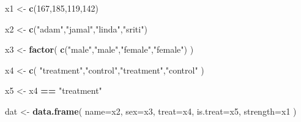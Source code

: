 \documentclass[]{book}
\newenvironment{Shaded}{\begin{snugshade}}{\end{snugshade}}
\newcommand{\DataTypeTok}[1]{\textcolor[rgb]{0.13,0.29,0.53}{#1}}
\newcommand{\DecValTok}[1]{\textcolor[rgb]{0.00,0.00,0.81}{#1}}
\newcommand{\KeywordTok}[1]{\textcolor[rgb]{0.13,0.29,0.53}{\textbf{#1}}}
\newcommand{\NormalTok}[1]{#1}
\newcommand{\OperatorTok}[1]{\textcolor[rgb]{0.81,0.36,0.00}{\textbf{#1}}}
\newcommand{\StringTok}[1]{\textcolor[rgb]{0.31,0.60,0.02}{#1}}
\theoremstyle{definition}
\theoremstyle{definition}
\theoremstyle{definition}
\theoremstyle{remark}
\begin{document}
\begin{Shaded}
\begin{Highlighting}[]
\NormalTok{x1 <-}\StringTok{ }\KeywordTok{c}\NormalTok{(}\DecValTok{167}\NormalTok{,}\DecValTok{185}\NormalTok{,}\DecValTok{119}\NormalTok{,}\DecValTok{142}\NormalTok{)}

\NormalTok{x2 <-}\StringTok{ }\KeywordTok{c}\NormalTok{(}\StringTok{"adam"}\NormalTok{,}\StringTok{"jamal"}\NormalTok{,}\StringTok{"linda"}\NormalTok{,}\StringTok{"sriti"}\NormalTok{)}

\NormalTok{x3 <-}\StringTok{ }\KeywordTok{factor}\NormalTok{( }\KeywordTok{c}\NormalTok{(}\StringTok{"male"}\NormalTok{,}\StringTok{"male"}\NormalTok{,}\StringTok{"female"}\NormalTok{,}\StringTok{"female"}\NormalTok{) )}

\NormalTok{x4 <-}\StringTok{ }\KeywordTok{c}\NormalTok{( }\StringTok{"treatment"}\NormalTok{,}\StringTok{"control"}\NormalTok{,}\StringTok{"treatment"}\NormalTok{,}\StringTok{"control"}\NormalTok{ )}

\NormalTok{x5 <-}\StringTok{ }\NormalTok{x4 }\OperatorTok{==}\StringTok{ "treatment"}

\NormalTok{dat <-}\StringTok{ }\KeywordTok{data.frame}\NormalTok{( }\DataTypeTok{name=}\NormalTok{x2, }\DataTypeTok{sex=}\NormalTok{x3, }\DataTypeTok{treat=}\NormalTok{x4, }\DataTypeTok{is.treat=}\NormalTok{x5, }\DataTypeTok{strength=}\NormalTok{x1 )}
\end{Highlighting}
\end{Shaded}
\end{document}
